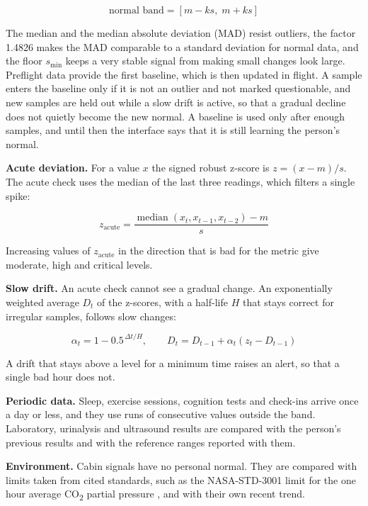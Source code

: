 \begin{equation}
\text{normal band}=\left[m-ks,\;m+ks\right]
\end{equation}

The median and the median absolute deviation (MAD) resist outliers, the factor 1.4826 makes the MAD comparable to a standard deviation for normal data, and the floor $s_{\min}$ keeps a very stable signal from making small changes look large. Preflight data provide the first baseline, which is then updated in flight. A sample enters the baseline only if it is not an outlier and not marked questionable, and new samples are held out while a slow drift is active, so that a gradual decline does not quietly become the new normal. A baseline is used only after enough samples, and until then the interface says that it is still learning the person's normal.

\medskip\noindent\textbf{Acute deviation.} For a value $x$ the signed robust z-score is $z=(x-m)/s$. The acute check uses the median of the last three readings, which filters a single spike:

\begin{equation}
z_{\text{acute}}=\frac{\operatorname{median}\left(x_t,x_{t-1},x_{t-2}\right)-m}{s}
\end{equation}

Increasing values of $z_{\text{acute}}$ in the direction that is bad for the metric give moderate, high and critical levels.

\medskip\noindent\textbf{Slow drift.} An acute check cannot see a gradual change. An exponentially weighted average $D_t$ of the z-scores, with a half-life $H$ that stays correct for irregular samples, follows slow changes:

\begin{equation}
\alpha_t=1-0.5^{\,\Delta t/H},\qquad D_t=D_{t-1}+\alpha_t\left(z_t-D_{t-1}\right)
\end{equation}

A drift that stays above a level for a minimum time raises an alert, so that a single bad hour does not.

\medskip\noindent\textbf{Periodic data.} Sleep, exercise sessions, cognition tests and check-ins arrive once a day or less, and they use runs of consecutive values outside the band. Laboratory, urinalysis and ultrasound results are compared with the person's previous results and with the reference ranges reported with them.

\medskip\noindent\textbf{Environment.} Cabin signals have no personal normal. They are compared with limits taken from cited standards, such as the NASA-STD-3001 limit for the one hour average CO\textsubscript{2} partial pressure \cite{nasa_ochmo_tb004_co2}, and with their own recent trend.

